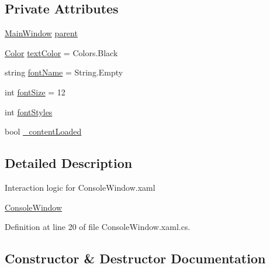 \subsection*{Private Attributes}
\begin{DoxyCompactItemize}
\item 
\hyperlink{class_c_p_u___o_s___simulator_1_1_main_window}{Main\+Window} \hyperlink{class_c_p_u___o_s___simulator_1_1_console_window_a1e38326bb40f4ed44c4964d94dc6f809}{parent}
\item 
\hyperlink{_console_window_8xaml_8cs_adf2800823d988ace598d734fdec29975}{Color} \hyperlink{class_c_p_u___o_s___simulator_1_1_console_window_a155c42bee25bd537a2656828bdf6f527}{text\+Color} = Colors.\+Black
\item 
string \hyperlink{class_c_p_u___o_s___simulator_1_1_console_window_a78375ad950278e847c76e7de38aa1e31}{font\+Name} = String.\+Empty
\item 
int \hyperlink{class_c_p_u___o_s___simulator_1_1_console_window_a0c319b98b649d11ffa185590e771cbb1}{font\+Size} = 12
\item 
int \hyperlink{class_c_p_u___o_s___simulator_1_1_console_window_abe8a7e3f2f861cd266a24426b2ffbc1c}{font\+Styles}
\item 
bool \hyperlink{class_c_p_u___o_s___simulator_1_1_console_window_a4836f04e93faa3749609d7eba72e1712}{\+\_\+content\+Loaded}
\end{DoxyCompactItemize}


\subsection{Detailed Description}
Interaction logic for Console\+Window.\+xaml 

\hyperlink{class_c_p_u___o_s___simulator_1_1_console_window}{Console\+Window} 

Definition at line 20 of file Console\+Window.\+xaml.\+cs.



\subsection{Constructor \& Destructor Documentation}
\hypertarget{class_c_p_u___o_s___simulator_1_1_console_window_abdd222b591f72c19297dc5805059ee7e}{}
